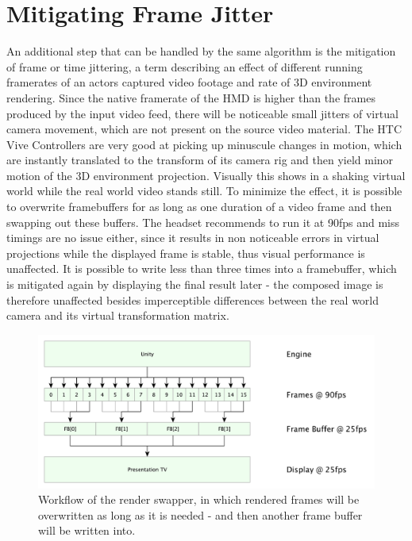 %
\section{Mitigating Frame Jitter}

An additional step that can be handled by the same algorithm is the mitigation 
of frame or time jittering, a term describing an effect of different running 
framerates of an actors captured video footage and rate of 3D environment 
rendering. Since the native framerate of the HMD is higher than the frames 
produced by the input video feed, there will be noticeable small jitters of 
virtual camera movement, which are not present on the source video material. 
The HTC Vive Controllers are very good at picking up minuscule changes in 
motion, which are instantly translated to the transform of its camera rig and 
then yield minor motion of the 3D environment projection. Visually this shows 
in a shaking virtual world while the real world video stands still.
\newline
To minimize the effect, it is possible to overwrite framebuffers for as long as 
one duration of a video frame and then swapping out these buffers. The headset 
recommends to run it at 90fps and miss timings are no issue either, since it 
results in non noticeable errors in virtual projections while the displayed 
frame is stable, thus visual performance is unaffected. It is possible to write 
less than three times into a framebuffer, which is mitigated again by 
displaying the final result later - the composed image is therefore unaffected 
besides imperceptible differences between the real world camera and its virtual 
transformation matrix.

\begin{figure}[htb]
	\centering
	\includegraphics[width=\textwidth]{gfx/Delay_Mitigation.pdf}
	\caption{Workflow of the render swapper, in which rendered frames will be 
		overwritten as long as it is needed - and then another frame buffer 
		will be 
		written into.}
	\label{fig:offsets:framesquashing}
\end{figure}

